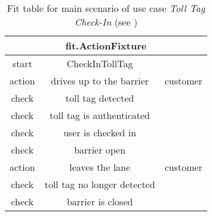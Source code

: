 
\begin{table}
\begin{centering}
\begin{tabular}{|c|c|c||c||c||c||c||c||c||c||c||c||c||c|}
\hline 
\multicolumn{14}{|c}{fit.ActionFixture}\tabularnewline
\hline 
start & CheckInTollTag & \multicolumn{12}{c|}{}\tabularnewline
\hline 
action & drives up to the barrier & \multicolumn{12}{c|}{customer}\tabularnewline
\hline 
check & toll tag detected & \multicolumn{12}{c|}{}\tabularnewline
\hline 
check & toll tag is authenticated & \multicolumn{12}{c|}{}\tabularnewline
\hline 
check & user is checked in & \multicolumn{12}{c|}{}\tabularnewline
\hline 
check & barrier open & \multicolumn{12}{c|}{}\tabularnewline
\hline 
action & leaves the lane & \multicolumn{12}{c|}{customer}\tabularnewline
\hline 
check & toll tag no longer detected & \multicolumn{12}{c|}{}\tabularnewline
\hline 
check & barrier is closed & \multicolumn{12}{c|}{}\tabularnewline
\hline 
\end{tabular}
\par\end{centering}

\caption{Fit table for main scenario of use case \emph{Toll Tag Check-In} (see )}
\end{table}

